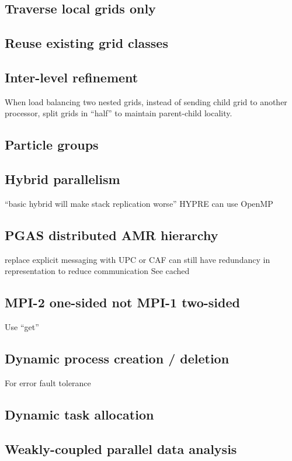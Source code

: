 \documentclass{article}
\begin{document}
\subsection{Traverse local grids only}\label{solution:amr-traversal-local}
\subsection{Reuse existing grid classes} \label{solution:amr-grid-reuse}
\subsection{Inter-level refinement} \label{solution:amr-balance-split}
When load balancing two nested grids, instead of
sending child grid to another processor, split grids
in ``half'' to maintain parent-child locality.
\subsection{Particle groups} \label{solution:particles-group}
\subsection{Hybrid parallelism}\label{solution:parallel-hybrid}
   ``basic hybrid will make stack replication worse''
   HYPRE can use OpenMP
\subsection{PGAS distributed AMR hierarchy} \label{solution:parallel-pgas}
   replace explicit messaging with UPC or CAF
   can still have redundancy in representation to reduce communication
   See cached
\subsection{MPI-2 one-sided not MPI-1 two-sided}  \label{solution:parallel-onesided}
   Use ``get''
\subsection{Dynamic process creation / deletion} \label{solution:parallel-dynamic-procs}
   For error fault tolerance
\subsection{Dynamic task allocation} \label{solution:parallel-dynamic-tasks}
\subsection{Weakly-coupled parallel data analysis}\label{solution:parallel-data-analysis}
\end{document}
